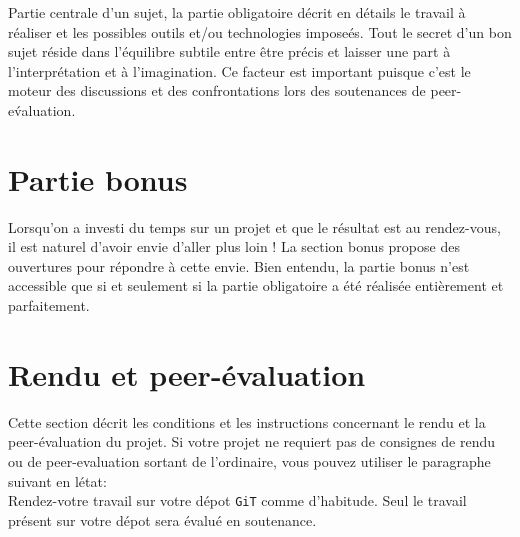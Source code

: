 \documentclass{42-fr}
\begin{document}
    Partie centrale d'un sujet, la partie obligatoire d\'ecrit en
    d\'etails le travail \`a r\'ealiser et les possibles outils et/ou
    technologies impose\'es. Tout le secret d'un bon sujet
    r\'eside dans l'\'equilibre subtile entre \^etre pr\'ecis et
    laisser une part \`a l'interpr\'etation et \`a l'imagination. Ce
    facteur est important puisque c'est le moteur des discussions et
    des confrontations lors des soutenances de peer-e\'valuation.



\chapter{Partie bonus}

    Lorsqu'on a investi du temps sur un projet et que le r\'esultat
    est au rendez-vous, il est naturel d'avoir envie d'aller plus loin
    ! La section bonus propose des ouvertures pour r\'epondre \`a
    cette envie. Bien entendu, la partie bonus n'est accessible que si
    et seulement si la partie obligatoire a \'et\'e r\'ealis\'ee
    enti\`erement et parfaitement.


\chapter{Rendu et peer-\'evaluation}

    Cette section d\'ecrit les conditions et les instructions
    concernant le rendu et la peer-\'evaluation du projet. Si votre
    projet ne requiert pas de consignes de rendu ou de peer-evaluation
    sortant de l'ordinaire, vous pouvez utiliser le paragraphe suivant
    en l\'etat:\\

    Rendez-votre travail sur votre d\'epot \texttt{GiT} comme
    d'habitude. Seul le travail pr\'esent sur votre d\'epot sera
    \'evalu\'e en soutenance.



\end{document}
